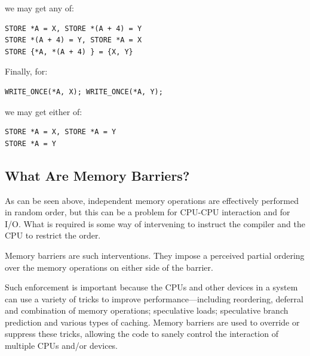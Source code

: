 \begin{enumerate}
	we may get any of:

\begin{minipage}[t]{\columnwidth}
\scriptsize
\begin{verbatim}
STORE *A = X, STORE *(A + 4) = Y
STORE *(A + 4) = Y, STORE *A = X
STORE {*A, *(A + 4) } = {X, Y}
\end{verbatim}
\vspace{1pt}
\end{minipage}

	Finally, for:

\begin{minipage}[t]{\columnwidth}
\scriptsize
\begin{verbatim}
WRITE_ONCE(*A, X); WRITE_ONCE(*A, Y);
\end{verbatim}
\end{minipage}

	we may get either of:

\begin{minipage}[t]{\columnwidth}
\scriptsize
\begin{verbatim}
STORE *A = X, STORE *A = Y
STORE *A = Y
\end{verbatim}
\end{minipage}

\end{enumerate}

\subsection{What Are Memory Barriers?}
\label{sec:advsync:What Are Memory Barriers?}

As can be seen above, independent memory operations are effectively performed
in random order, but this can be a problem for CPU-CPU interaction and for I/O.
What is required is some way of intervening to instruct the compiler and the
CPU to restrict the order.

Memory barriers are such interventions.  They impose a perceived partial
ordering over the memory operations on either side of the barrier.

Such enforcement is important because the CPUs and other devices in a system
can use a variety of tricks to improve performance---including reordering,
deferral and combination of memory operations; speculative loads; speculative
branch prediction and various types of caching.  Memory barriers are used to
override or suppress these tricks, allowing the code to sanely control the
interaction of multiple CPUs and/or devices.


